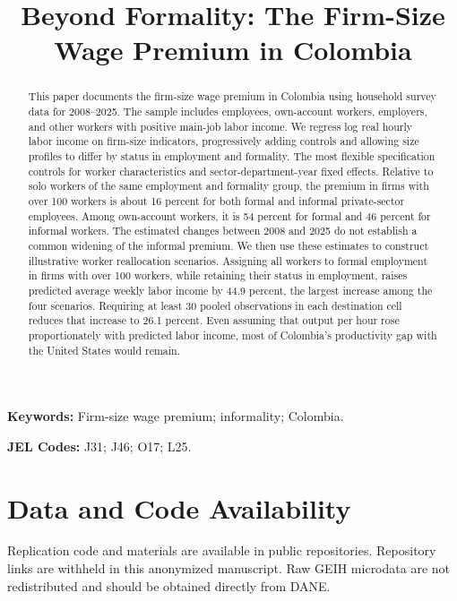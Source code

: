 \documentclass[12pt]{article}
\title{Beyond Formality: The Firm-Size Wage Premium in Colombia}
\author{}
\date{}
\begin{document}
\maketitle

\begin{abstract}
This paper documents the firm-size wage premium in Colombia using household survey data for 2008--2025. The sample includes employees, own-account workers, employers, and other workers with positive main-job labor income. We regress log real hourly labor income on firm-size indicators, progressively adding controls and allowing size profiles to differ by status in employment and formality. The most flexible specification controls for worker characteristics and sector-department-year fixed effects. Relative to solo workers of the same employment and formality group, the premium in firms with over 100 workers is about 16 percent for both formal and informal private-sector employees. Among own-account workers, it is 54 percent for formal and 46 percent for informal workers. The estimated changes between 2008 and 2025 do not establish a common widening of the informal premium. We then use these estimates to construct illustrative worker reallocation scenarios. Assigning all workers to formal employment in firms with over 100 workers, while retaining their status in employment, raises predicted average weekly labor income by 44.9 percent, the largest increase among the four scenarios. Requiring at least 30 pooled observations in each destination cell reduces that increase to 26.1 percent. Even assuming that output per hour rose proportionately with predicted labor income, most of Colombia's productivity gap with the United States would remain.
\end{abstract}

\vspace{0.5em}
\noindent\textbf{Keywords:} Firm-size wage premium; informality; Colombia.

\vspace{0.5em}
\noindent\textbf{JEL Codes:} J31; J46; O17; L25.










\appendix


\section*{Data and Code Availability}

Replication code and materials are available in public repositories. Repository links are withheld in this anonymized manuscript. Raw GEIH microdata are not redistributed and should be obtained directly from DANE.



\end{document}
